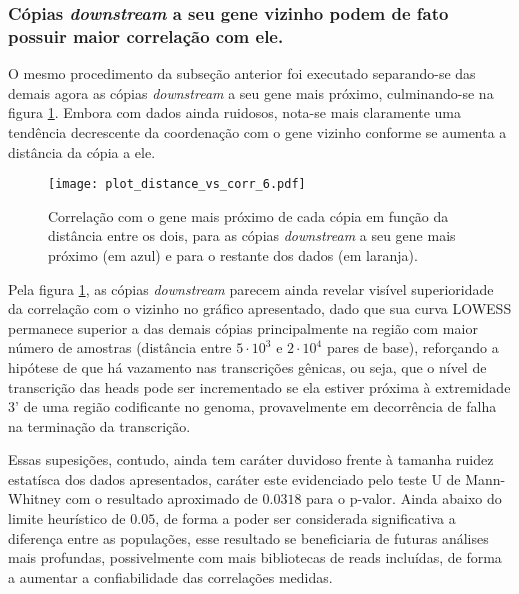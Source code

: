 \documentclass[12pt]{article}
\begin{document}
\begin{multicols}{2}
\subsubsection{Cópias \textit{downstream} a seu gene vizinho podem de fato possuir maior correlação com ele.}
O mesmo procedimento da subseção anterior foi executado separando-se das demais agora as cópias \textit{downstream} a seu gene mais próximo, culminando-se na figura \ref{updownstream}. Embora com dados ainda ruidosos, nota-se mais claramente uma tendência decrescente da coordenação com o gene vizinho conforme se aumenta a distância da cópia a ele.

\begin{figure}[H]
	\centering
	\label{updownstream}
	\texttt{[image: plot\_distance\_vs\_corr\_6.pdf]}
	\caption{Correlação com o gene mais próximo de cada cópia em função da distância entre os dois, para as cópias \textit{downstream} a seu gene mais próximo (em azul) e para o restante dos dados (em laranja).}
\end{figure}

Pela figura \ref{updownstream}, as cópias \textit{downstream} parecem ainda revelar visível superioridade da correlação com o vizinho no gráfico apresentado, dado que sua curva LOWESS permanece superior a das demais cópias principalmente na região com maior número de amostras (distância entre \(5\cdot 10^3\) e \(2 \cdot 10^4\) pares de base), reforçando a hipótese de que há vazamento nas transcrições gênicas, ou seja, que o nível de transcrição das heads pode ser incrementado se ela estiver próxima à extremidade 3' de uma região codificante no genoma, provavelmente em decorrência de falha na terminação da transcrição.

Essas supesições, contudo, ainda tem caráter duvidoso frente à tamanha ruidez estatísca dos dados apresentados, caráter este evidenciado pelo teste U de Mann-Whitney com o resultado aproximado de \(0.0318\) para o p-valor. Ainda abaixo do limite heurístico de \(0.05\), de forma a poder ser considerada significativa a diferença entre as populações, esse resultado se beneficiaria de futuras análises mais profundas, possivelmente com mais bibliotecas de reads incluídas, de forma a aumentar a confiabilidade das correlações medidas.


\end{multicols}
\end{document}

